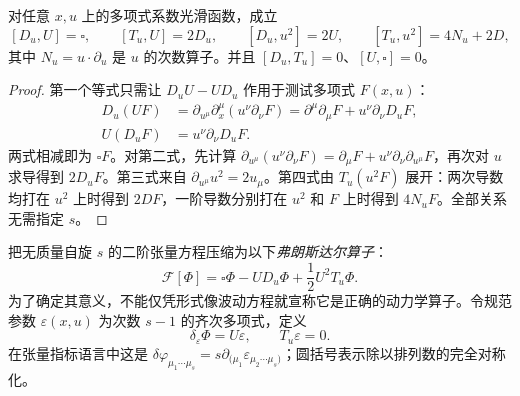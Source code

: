 \begin{lemma}[高自旋微分算子的交换代数]\label{lem:ghs-r7-fronsdal-algebra}
对任意 $x,u$ 上的多项式系数光滑函数，成立
\begin{equation}\label{eq:ghs-r7-fronsdal-commutators}
 [D_u,U]=\square,\qquad [T_u,U]=2D_u,\qquad
 [D_u,u^2]=2U,\qquad [T_u,u^2]=4N_u+2D,
\end{equation}
其中 $N_u=u\cdot\partial_u$ 是 $u$ 的次数算子。并且 $[D_u,T_u]=0$、$[U,\square]=0$。
\end{lemma}
\begin{proof}
第一个等式只需让 $D_uU-UD_u$ 作用于测试多项式 $F(x,u)$：
\begin{align*}
 D_u(UF)&=\partial_{u^\mu}\partial^\mu_x
 (u^\nu\partial_\nu F)
 =\partial^\mu\partial_\mu F
 +u^\nu\partial_\nu D_uF,\\
 U(D_uF)&=u^\nu\partial_\nu D_uF.
\end{align*}
两式相减即为 $\square F$。对第二式，先计算
$\partial_{u^\mu}(u^\nu\partial_\nu F)=\partial_\mu F+u^\nu\partial_\nu\partial_{u^\mu}F$，再次对 $u$ 求导得到 $2D_uF$。第三式来自 $\partial_{u^\mu}u^2=2u_\mu$。第四式由 $T_u(u^2F)$ 展开：两次导数均打在 $u^2$ 上时得到 $2DF$，一阶导数分别打在 $u^2$ 和 $F$ 上时得到 $4N_uF$。全部关系无需指定 $s$。
\end{proof}

把无质量自旋 $s$ 的二阶张量方程压缩为以下\emph{弗朗斯达尔算子}：
\begin{equation}\label{eq:ghs-r7-fronsdal-operator}
 \mathcal F[\Phi]=\square\Phi-U D_u\Phi
 +\frac12U^2T_u\Phi.
\end{equation}
为了确定其意义，不能仅凭形式像波动方程就宣称它是正确的动力学算子。令规范参数 $\varepsilon(x,u)$ 为次数 $s-1$ 的齐次多项式，定义
\begin{equation}\label{eq:ghs-r7-fronsdal-gauge}
 \delta_\varepsilon\Phi=U\varepsilon,\qquad
 T_u\varepsilon=0.
\end{equation}
在张量指标语言中这是 $\delta\varphi_{\mu_1\cdots\mu_s}=s\partial_{(\mu_1}\varepsilon_{\mu_2\cdots\mu_s)}$；圆括号表示除以排列数的完全对称化。

